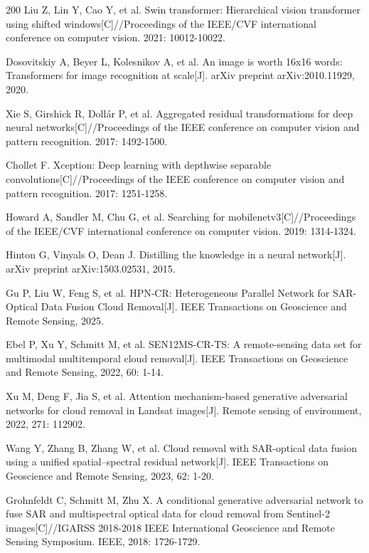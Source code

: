 \begin{thebibliography}{200}
Liu Z, Lin Y, Cao Y, et al. Swin transformer: Hierarchical vision transformer using shifted windows[C]//Proceedings of the IEEE/CVF international conference on computer vision. 2021: 10012-10022.

% 
Dosovitskiy A, Beyer L, Kolesnikov A, et al. An image is worth 16x16 words: Transformers for image recognition at scale[J]. arXiv preprint arXiv:2010.11929, 2020.


% 
Xie S, Girshick R, Dollár P, et al. Aggregated residual transformations for deep neural networks[C]//Proceedings of the IEEE conference on computer vision and pattern recognition. 2017: 1492-1500.


% 
Chollet F. Xception: Deep learning with depthwise separable convolutions[C]//Proceedings of the IEEE conference on computer vision and pattern recognition. 2017: 1251-1258.

Howard A, Sandler M, Chu G, et al. Searching for mobilenetv3[C]//Proceedings of the IEEE/CVF international conference on computer vision. 2019: 1314-1324.

% 
Hinton G, Vinyals O, Dean J. Distilling the knowledge in a neural network[J]. arXiv preprint arXiv:1503.02531, 2015.


% 
Gu P, Liu W, Feng S, et al. HPN-CR: Heterogeneous Parallel Network for SAR-Optical Data Fusion Cloud Removal[J]. IEEE Transactions on Geoscience and Remote Sensing, 2025.


Ebel P, Xu Y, Schmitt M, et al. SEN12MS-CR-TS: A remote-sensing data set for multimodal multitemporal cloud removal[J]. IEEE Transactions on Geoscience and Remote Sensing, 2022, 60: 1-14.


% 
Xu M, Deng F, Jia S, et al. Attention mechanism-based generative adversarial networks for cloud removal in Landsat images[J]. Remote sensing of environment, 2022, 271: 112902.

Wang Y, Zhang B, Zhang W, et al. Cloud removal with SAR-optical data fusion using a unified spatial–spectral residual network[J]. IEEE Transactions on Geoscience and Remote Sensing, 2023, 62: 1-20.

Grohnfeldt C, Schmitt M, Zhu X. A conditional generative adversarial network to fuse SAR and multispectral optical data for cloud removal from Sentinel-2 images[C]//IGARSS 2018-2018 IEEE International Geoscience and Remote Sensing Symposium. IEEE, 2018: 1726-1729.


\end{thebibliography}
